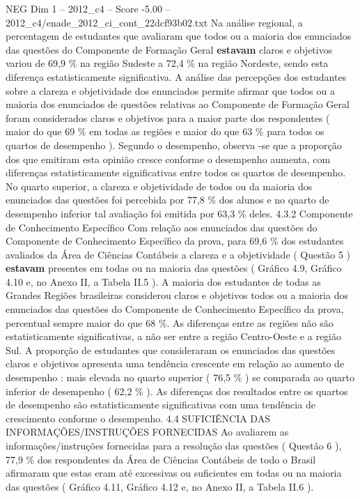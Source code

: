 \begin{textsample}{NEG Dim 1 – 2012\_c4 – Score -5.00 – 2012\_c4/enade\_2012\_ci\_cont\_22dcf93b02.txt}
Na análise regional, a percentagem de estudantes que avaliaram que todos ou a maioria dos enunciados das questões do Componente de Formação Geral \textbf{estavam} claros e objetivos variou de 69,9 \% na região Sudeste a 72,4 \% na região Nordeste, sendo esta diferença estatisticamente significativa.
A análise das percepções dos estudantes sobre a clareza e objetividade dos enunciados permite afirmar que todos ou a maioria dos enunciados de questões relativas ao Componente de Formação Geral foram considerados claros e objetivos para a maior parte dos respondentes ( maior do que 69 \% em todas as regiões e maior do que 63 \% para todos os quartos de desempenho ).
Segundo o desempenho, observa -se que a proporção dos que emitiram esta opinião cresce conforme o desempenho aumenta, com diferenças estatisticamente significativas entre todos os quartos de desempenho.
No quarto superior, a clareza e objetividade de todos ou da maioria dos enunciados das questões foi percebida por 77,8 \% dos alunos e no quarto de desempenho inferior tal avaliação foi emitida por 63,3 \% deles. 4.3.2 Componente de Conhecimento Específico Com relação aos enunciados das questões do Componente de Conhecimento Específico da prova, para 69,6 \% dos estudantes avaliados da Área de Ciências Contábeis a clareza e a objetividade ( Questão 5 ) \textbf{estavam} presentes em todas ou na maioria das questões ( Gráfico 4.9, Gráfico 4.10 e, no Anexo II, a Tabela II.5 ).
A maioria dos estudantes de todas as Grandes Regiões brasileiras considerou claros e objetivos todos ou a maioria dos enunciados das questões do Componente de Conhecimento Específico da prova, percentual sempre maior do que 68 \%.
As diferenças entre as regiões não são estatisticamente significativas, a não ser entre a região Centro-Oeste e a região Sul.
A proporção de estudantes que consideraram os enunciados das questões claros e objetivos apresenta uma tendência crescente em relação ao aumento de desempenho : mais elevada no quarto superior ( 76,5 \% ) se comparada ao quarto inferior de desempenho ( 62,2 \% ).
As diferenças dos resultados entre os quartos de desempenho são estatisticamente significativas com uma tendência de crescimento conforme o desempenho. 4.4 SUFICIÊNCIA DAS INFORMAÇÕES/INSTRUÇÕES FORNECIDAS Ao avaliarem as informações/instruções fornecidas para a resolução das questões ( Questão 6 ), 77,9 \% dos respondentes da Área de Ciências Contábeis de todo o Brasil afirmaram que estas eram até excessivas ou suficientes em todas ou na maioria das questões ( Gráfico 4.11, Gráfico 4.12 e, no Anexo II, a Tabela II.6 ).

\end{textsample}
